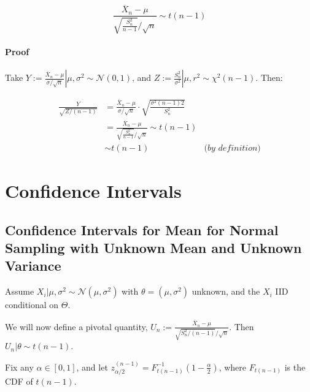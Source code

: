 \documentclass[a4paper]{article}
\begin{document}
                \[
                    \frac{\overline X_n - \mu}{\sqrt{\frac{S_n^2}{n -
                    1}}/\sqrt{n}} \sim t(n - 1)
                \]

                \paragraph{Proof}
                    Take $Y := \left.\frac{\overline X_n - \mu}{\sigma /
                    \sqrt{n}} \right | \mu, \sigma^2 \sim \mathcal{N}(0, 1)$,
                    and $Z := \left. \frac{S_n^2}{\sigma^2} \right| \mu, r^2
                    \sim \chi^2(n - 1)$. Then:

                    \begin{align*}
                        \frac{Y}{\sqrt{Z/(n-1)}} & = \frac{\overline X_n -
                            \mu}{\sigma/\sqrt{n}} \cdot
                            \sqrt{\frac{\sigma^2(n-1)2}{S_n^2}} \\
                        & = \frac{\overline X_n - \mu}{\sqrt{\frac{S_n^2}{n -
                            1}}/\sqrt{n}} \sim t(n - 1) \\
                        & \sim t(n - 1) & \textit{(by definition)}
                    \end{align*}

    \newpage
    \section{Confidence Intervals}
        \begin{fread}
            [DS12, section 8.5]
        \end{fread}

        \subsection{Confidence Intervals for Mean for Normal Sampling with
        Unknown Mean and Unknown Variance}
            Assume $X_i | \mu, \sigma^2 \sim \mathcal{N}(\mu, \sigma^2)$ with
            $\theta = (\mu, \sigma^2)$ unknown, and the $X_i$ IID conditional on
            $\Theta$.

            We will now define a pivotal quantity, $U_n := \frac{\overline X_n -
            \mu}{\sqrt{S_n^2/(n-1)} / \sqrt{n}}$. Then $U_n | \theta \sim
            t(n-1)$.

            Fix any $\alpha \in [0, 1]$, and let $z_{\alpha/2}^{(n - 1)} =
            F_{t(n-1)}^{-1} \left(1 - \frac{\alpha}{2}\right)$, where
            $F_{t(n-1)}$ is the CDF of $t(n-1)$.
\end{document}
